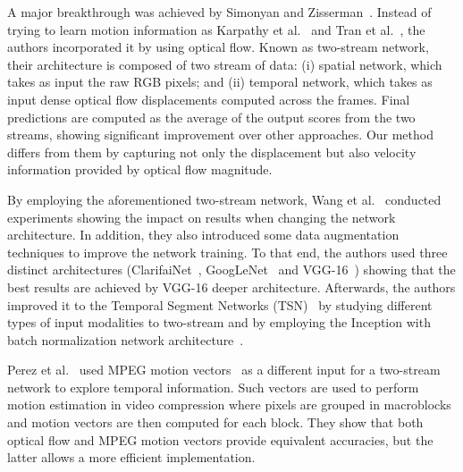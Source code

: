 \documentclass[10pt,conference]{IEEEtran}
\begin{document}
A major breakthrough was achieved by Simonyan and Zisserman~\cite{Simonyan:2014}. Instead of trying to learn motion information as Karpathy et al.~\cite{Karpathy:2014} and Tran et al.~\cite{Tran:2015}, the authors incorporated it by using optical flow. Known as two-stream network, their architecture is composed of two stream of data: (i) spatial network, which takes as input the raw RGB pixels; and (ii) temporal network, which takes as input dense optical flow displacements computed across the frames. Final predictions are computed as the average of the output scores from the two streams, showing significant improvement over other approaches. Our method differs from them by capturing not only the displacement but also velocity information provided by optical flow magnitude.

By employing the aforementioned two-stream network, Wang et al.~\cite{Wang:2015} conducted experiments showing the impact on results when changing the network architecture. In addition, they also introduced some data augmentation techniques to improve the network training. To that end, the authors used three distinct architectures (ClarifaiNet~\cite{Zeiler:2014}, GoogLeNet~\cite{Szegedy:2015} and VGG-16~\cite{Simonyan:2014b}) showing that the best results are achieved by VGG-16 deeper architecture. Afterwards, the authors improved it to the Temporal Segment Networks (TSN)~\cite{Wang:2016} by studying different types of input modalities to two-stream and by employing the Inception with batch normalization network architecture~\cite{Ioffe:2015}.

Perez et al.~\cite{Perez:2017} used MPEG motion vectors~\cite{Richardson:2003} as a different input for a two-stream network to explore temporal information. Such vectors are used to perform motion estimation in video compression where pixels are grouped in macroblocks and motion vectors are then computed for each block. They show that both optical flow and MPEG motion vectors provide equivalent accuracies, but the latter allows a more efficient implementation.

\end{document}
